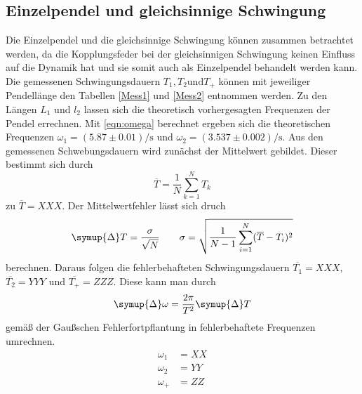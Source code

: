 \subsection{Einzelpendel und gleichsinnige Schwingung}
\label{subsec:Einzelpendelugleichsinnig}
Die Einzelpendel und die gleichsinnige Schwingung können zusammen betrachtet werden, da die Kopplungsfeder bei der gleichsinnigen Schwingung keinen Einfluss auf die Dynamik hat und sie
somit auch als Einzelpendel behandelt werden kann. Die gemessenen Schwingungsdauern $T_1, T_2 \text{und} T_+$ können mit jeweiliger Pendellänge den Tabellen \autoref{Mess1} 
und \autoref{Mess2} entnommen werden. Zu den Längen $L_1$ und $l_2$ lassen sich die theoretisch vorhergesagten Frequenzen der Pendel errechnen. Mit \autoref{eqn:omega} berechnet 
ergeben sich die theoretischen Frequenzen $\omega_1 = (5.87\pm 0.01)\unit{\per\second}$ und $\omega_2 = (3.537\pm 0.002)\unit{\per\second}$. Aus den gemessenen Schwebungsdauern wird 
zunächst der Mittelwert gebildet. Dieser bestimmt sich durch 
\begin{equation}
    \label{eqn:Mittelwert}
    \overline{T} = \frac{1}{N}\sum_{k = 1}^N T_k
\end{equation}
zu $\overline{T} = XXX$. Der Mittelwertfehler lässt sich druch 
\begin{equation}
    \label{eqn:MWFehler}
    \symup{\Delta} T = \frac{\sigma}{\sqrt{N}} \qquad \sigma = \sqrt{\frac{1}{N-1}\sum_{i = 1}^N (\overline{T}-T_i)^2}
\end{equation}
berechnen. Daraus folgen die fehlerbehafteten Schwingungsdauern $\overline{T_1} = XXX$, $\overline{T_2} = YYY$ und $\overline{T_+} =ZZZ$. Diese kann man durch 
\begin{equation}
    \label{eqn:DeltaOmega}
    \symup{\Delta}\omega = \frac{2\pi}{T^2}\symup{\Delta}T
\end{equation}
gemäß der Gaußschen Fehlerfortpflantung in fehlerbehaftete Frequenzen umrechnen. 
\begin{align*}
    \omega_1 &= XX \\
    \omega_2 &= YY \\
    \omega_+ &= ZZ \\
\end{align*}
